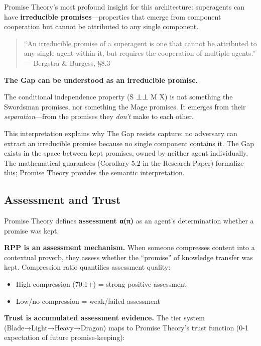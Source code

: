 \documentclass[
]{article}
\providecommand{\tightlist}{%
  \setlength{\itemsep}{0pt}\setlength{\parskip}{0pt}}
\begin{document}
Promise Theory's most profound insight for this architecture:
superagents can have \textbf{irreducible promises}---properties that
emerge from component cooperation but cannot be attributed to any single
component.

\begin{quote}
``An irreducible promise of a superagent is one that cannot be
attributed to any single agent within it, but requires the cooperation
of multiple agents.'' --- Bergstra \& Burgess, §8.3
\end{quote}

\textbf{The Gap can be understood as an irreducible promise.}

The conditional independence property (S ⊥⊥ M \textbar{} X) is not
something the Swordsman promises, nor something the Mage promises. It
emerges from their \emph{separation}---from the promises they
\emph{don't} make to each other.

This interpretation explains why The Gap resists capture: no adversary
can extract an irreducible promise because no single component contains
it. The Gap exists in the space between kept promises, owned by neither
agent individually. The mathematical guarantees (Corollary 5.2 in the
Research Paper) formalize this; Promise Theory provides the semantic
interpretation.

\subsection{Assessment and Trust}\label{assessment-and-trust}

Promise Theory defines \textbf{assessment α(π)} as an agent's
determination whether a promise was kept.

\textbf{RPP is an assessment mechanism.} When someone compresses content
into a contextual proverb, they assess whether the ``promise'' of
knowledge transfer was kept. Compression ratio quantifies assessment
quality:

\begin{itemize}
\tightlist
\item
  High compression (70:1+) = strong positive assessment
\item
  Low/no compression = weak/failed assessment
\end{itemize}

\textbf{Trust is accumulated assessment evidence.} The tier system
(Blade→Light→Heavy→Dragon) maps to Promise Theory's trust function (0-1
expectation of future promise-keeping):
\end{document}
